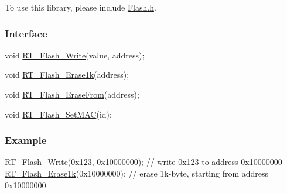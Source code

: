 To use this library, please include {\ttfamily \mbox{\hyperlink{a00038}{Flash.\+h}}}.

\subsubsection*{Interface}


\begin{DoxyCode}
\textcolor{keywordtype}{void} \mbox{\hyperlink{a00038_a13fb43316f72b3b1b9467a91fca08d5c}{RT\_Flash\_Write}}(value, address);

\textcolor{keywordtype}{void} \mbox{\hyperlink{a00038_ab65db3c66c91da3a934540a2f8175803}{RT\_Flash\_Erase1k}}(address);

\textcolor{keywordtype}{void} \mbox{\hyperlink{a00038_afb9cdf54d7254cfef685cd4012113b27}{RT\_Flash\_EraseFrom}}(address);

\textcolor{keywordtype}{void} \mbox{\hyperlink{a00038_a99ec94a33a9126a436139061d9e0136b}{RT\_Flash\_SetMAC}}(\textcolor{keywordtype}{id});
\end{DoxyCode}


\subsubsection*{Example}


\begin{DoxyCode}
\mbox{\hyperlink{a00038_a13fb43316f72b3b1b9467a91fca08d5c}{RT\_Flash\_Write}}(0x123, 0x10000000);     \textcolor{comment}{// write 0x123 to address 0x10000000}
\mbox{\hyperlink{a00038_ab65db3c66c91da3a934540a2f8175803}{RT\_Flash\_Erase1k}}(0x10000000);          \textcolor{comment}{// erase 1k-byte, starting from address 0x10000000}
\end{DoxyCode}
 
